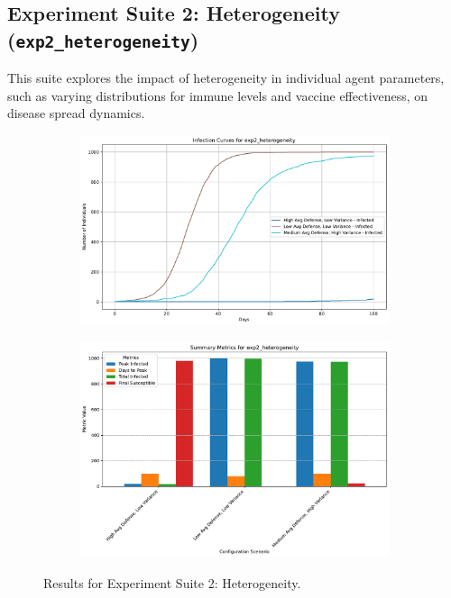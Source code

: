 \documentclass[12pt]{article}
\begin{document}
\subsection[Exp Suite 2: Heterogeneity]{Experiment Suite 2: Heterogeneity (\texttt{exp2\_het\-er\-o\-ge\-ne\-i\-ty})}
This suite explores the impact of heterogeneity in individual agent parameters, such as varying distributions for immune levels and vaccine effectiveness, on disease spread dynamics.
\begin{figure}[htbp!]
\centering
\begin{subfigure}{.48\textwidth}
\centering
\includegraphics[width=\linewidth]{../results/exp2_heterogeneity/infection_curves.pdf}
\label{fig:exp2_curves}
\end{subfigure}
\hfill
\begin{subfigure}{.48\textwidth}
\centering
\includegraphics[width=\linewidth]{../results/exp2_heterogeneity/summary_metrics_grouped_summary.pdf}
\label{fig:exp2_summary}
\end{subfigure}
\caption[Exp Suite 2 Results]{Results for Experiment Suite 2: Heterogeneity.}
\label{fig:exp2_results}
\end{figure}
\end{document}
